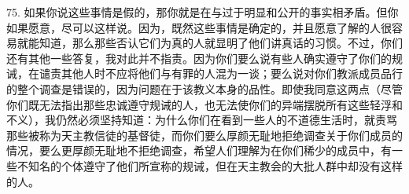75. 如果你说这些事情是假的，那你就是在与过于明显和公开的事实相矛盾。但你如果愿意，尽可以这样说。因为，既然这些事情是确定的，并且愿意了解的人很容易就能知道，那么那些否认它们为真的人就显明了他们讲真话的习惯。不过，你们还有其他一些答复，我对此并不指责。因为你们要么说有些人确实遵守了你们的规诫，在谴责其他人时不应将他们与有罪的人混为一谈；要么说对你们教派成员品行的整个调查是错误的，因为问题在于该教义本身的品性。即使我同意这两点（尽管你们既无法指出那些忠诚遵守规诫的人，也无法使你们的异端摆脱所有这些轻浮和不义），我仍然必须坚持知道：为什么你们在看到一些人的不道德生活时，就责骂那些被称为天主教信徒的基督徒，而你们要么厚颜无耻地拒绝调查关于你们成员的情况，要么更厚颜无耻地不拒绝调查，希望人们理解为在你们稀少的成员中，有一些不知名的个体遵守了他们所宣称的规诫，但在天主教会的大批人群中却没有这样的人。\par

